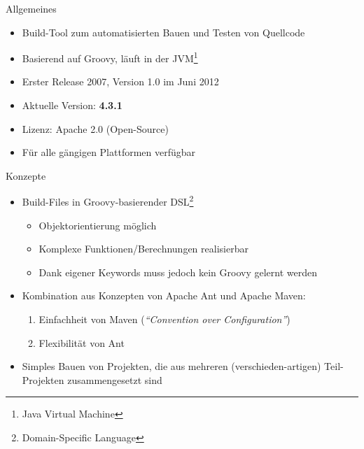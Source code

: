 \documentclass[newPxFont,numfooter,sectionpages,notes]{beamer}
\begin{document}
\begin{frame}{Allgemeines}
	\begin{itemize}
		\item Build-Tool zum automatisierten Bauen und Testen von Quellcode
		\item Basierend auf Groovy, läuft in der JVM\footnote{Java Virtual Machine}
		\item Erster Release 2007, Version 1.0 im Juni 2012
		\item Aktuelle Version: \textbf{4.3.1}
		\item Lizenz: Apache 2.0 (Open-Source) 
		\item Für alle gängigen Plattformen verfügbar
	\end{itemize}
\end{frame}

\begin{frame}{Konzepte}
\begin{itemize}
	\item Build-Files in Groovy-basierender DSL\footnote{Domain-Specific Language}
		\begin{itemize}
			\item Objektorientierung möglich
			\item Komplexe Funktionen/Berechnungen realisierbar
			\item Dank eigener Keywords muss jedoch kein Groovy gelernt werden
		\end{itemize}
	\item Kombination aus Konzepten von \alert{Apache Ant} und \alert{Apache Maven}:
		\begin{enumerate}
			\item Einfachheit von Maven (\emph{\enquote{Convention over Configuration}})
			\item Flexibilität von Ant
		\end{enumerate}
	\item Simples Bauen von Projekten, die aus mehreren (verschieden-artigen) Teil-Projekten zusammengesetzt sind
\end{itemize}
\end{frame}
\end{document}
